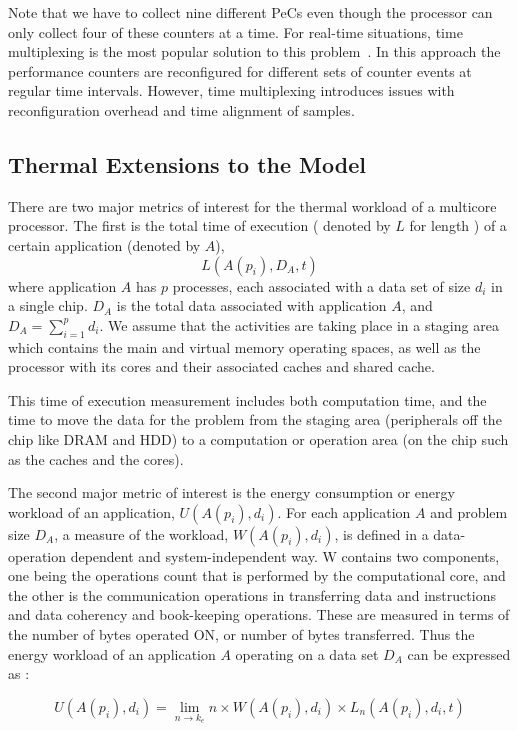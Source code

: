 \documentclass[acmtaco]{acmtrans2m}
\begin{document}
Note that we have to collect nine different PeCs even though the
processor can only collect four of these counters at a time.  For
real-time situations, time multiplexing is the most popular solution to
this problem~\cite{Azimi2005}. In this approach the performance
counters are reconfigured for different sets of counter events at
regular time intervals.  However, time multiplexing introduces issues
with reconfiguration overhead and time alignment of samples.

\subsection{Thermal  Extensions to the Model}
\label{sec:themalmodel}
There are two major metrics of interest for the thermal workload of a
multicore processor. The first is the total time of execution ( denoted
by $L$ for length ) of a certain application (denoted by $A$),
\begin{equation}
L(A(p_i),D_A,t)\nonumber
\end{equation}
where application $A$ has $p$ processes, each associated with a data set
of size $d_i$ in a single chip. $D_A$ is the total data associated with
application $A$, and $D_A = \sum_{i=1}^p{d_i}$.  We assume that the
activities are taking place in a staging area which contains the main
and virtual memory operating spaces, as well as the processor with its
cores and their associated caches and shared cache.

This time of execution measurement includes both computation time, and
the time to move the data for the problem from the staging area
(peripherals off the chip like DRAM and HDD) to a computation or
operation area (on the chip such as the caches and the cores).

The second major metric of interest is the energy consumption or energy
workload of an application, $U(A(p_i),d_i)$. For each application $A$
and problem size $D_A$, a measure of the workload, $W(A(p_i),d_i)$, is
defined in a data-operation dependent and system-independent way. W
contains two components, one being the operations count that is
performed by the computational core, and the other is the communication
operations in transferring data and instructions and data coherency and
book-keeping operations. These are measured in terms of the number of
bytes operated ON, or number of bytes transferred. Thus the energy
workload of an application $A$ operating on a data set $D_A$ can be
expressed as :

\begin{equation}
U(A(p_i),d_i) = \displaystyle \lim_{n \to k_e }n \times W(A(p_i),d_i) \times L_n(A(p_i),d_i,t) \nonumber
\end{equation}
\end{document}
